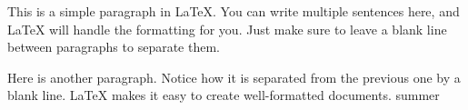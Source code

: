 \documentclass{article}
\begin{document}
This is a simple paragraph in LaTeX. You can write multiple sentences here, and LaTeX will handle the formatting for you. Just make sure to leave a blank line between paragraphs to separate them.

Here is another paragraph. Notice how it is separated from the previous one by a blank line. LaTeX makes it easy to create well-formatted documents.
summer
\end{document}

